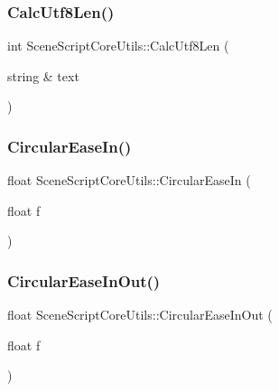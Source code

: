 \hypertarget{class_scene_script_core_utils_a3fc4ba1bbf123ddb308dc694074a61d9}{}\label{class_scene_script_core_utils_a3fc4ba1bbf123ddb308dc694074a61d9} 
\subsubsection{\texorpdfstring{Calc\+Utf8\+Len()}{CalcUtf8Len()}}
{\footnotesize\ttfamily int Scene\+Script\+Core\+Utils\+::\+Calc\+Utf8\+Len (\begin{DoxyParamCaption}\item[{string \&}]{text }\end{DoxyParamCaption})}

\hypertarget{class_scene_script_core_utils_a4755b60f0944b8b8c8850264fd1541f2}{}\label{class_scene_script_core_utils_a4755b60f0944b8b8c8850264fd1541f2} 
\subsubsection{\texorpdfstring{Circular\+Ease\+In()}{CircularEaseIn()}}
{\footnotesize\ttfamily float Scene\+Script\+Core\+Utils\+::\+Circular\+Ease\+In (\begin{DoxyParamCaption}\item[{float}]{f }\end{DoxyParamCaption})}

\hypertarget{class_scene_script_core_utils_a8f77fb5aaeabadb8db9656339e32fff9}{}\label{class_scene_script_core_utils_a8f77fb5aaeabadb8db9656339e32fff9} 
\subsubsection{\texorpdfstring{Circular\+Ease\+In\+Out()}{CircularEaseInOut()}}
{\footnotesize\ttfamily float Scene\+Script\+Core\+Utils\+::\+Circular\+Ease\+In\+Out (\begin{DoxyParamCaption}\item[{float}]{f }\end{DoxyParamCaption})}

